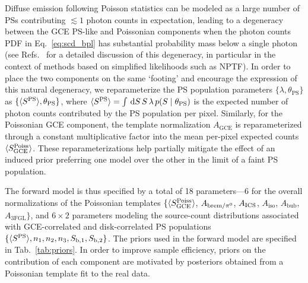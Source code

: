 \documentclass[prd,aps,10pt,nofootinbib,twocolumn,superscriptaddress,preprintnumbers,balancelastpage,longbibliography]{revtex4-1}
\begin{document}
Diffuse emission following Poisson statistics can be modeled as a large number of PSs contributing $\lesssim 1$ photon counts in expectation, leading to a degeneracy between the GCE PS-like and Poissonian components when the photon counts PDF in Eq.~\eqref{eq:scd_bpl} has substantial probability mass below a single photon (see Refs.~\cite{Chang:2019ars,Collin:2021ufc} for a detailed discussion of this degeneracy, in particular in the context of methods based on simplified likelihoods such as NPTF). In order to place the two components on the same `footing' and encourage the expression of this natural degeneracy, we reparameterize the PS population parameters $\{\lambda, \theta_\mathrm{PS}\}$ as $\{\langle S^{\rm PS} \rangle, \theta_\mathrm{PS}\}$, where $\langle S^{\rm PS} \rangle = \int\,\mathrm{d} S\,S\,\lambda \, p(S\mid\theta_\mathrm{PS})$ is the expected number of photon counts contributed by the PS population per pixel. Similarly, for the Poissonian GCE component, the template normalization $A_\mathrm{GCE}$ is reparameterized through a constant multiplicative factor into the mean per-pixel expected counts $\langle S^{\rm Poiss}_\mathrm{GCE} \rangle$. These reparameterizations help partially mitigate the effect of an induced prior preferring one model over the other in the limit of a faint PS population.

The forward model is thus specified by a total of 18 parameters---6 for the overall normalizations of the Poissonian templates $\{\langle S_{\rm GCE}^{\rm Poiss} \rangle$, $A_{{\rm brem}/\pi^0}$, $A_{\rm ICS}$, $A_\text{iso}$, $A_\text{bub}$, $A_\text{3FGL}\}$, and $6\times2$ parameters modeling the source-count distributions associated with GCE-correlated and disk-correlated PS populations $\{\langle S^{\rm PS} \rangle, n_1, n_2, n_3, S_{\mathrm b, 1}, S_{\mathrm b, 2}\}$. The priors used in the forward model are specified in Tab.~\ref{tab:priors}. In order to improve sample efficiency, priors on the contribution of each component are motivated by posteriors obtained from a Poissonian template fit to the real \Fermi data. 
\end{document}
